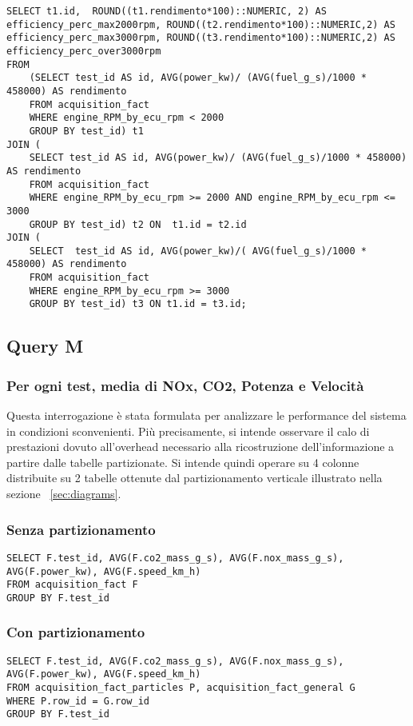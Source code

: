 \begin{lstlisting}[language=mySQL]
SELECT t1.id,  ROUND((t1.rendimento*100)::NUMERIC, 2) AS efficiency_perc_max2000rpm, ROUND((t2.rendimento*100)::NUMERIC,2) AS efficiency_perc_max3000rpm, ROUND((t3.rendimento*100)::NUMERIC,2) AS efficiency_perc_over3000rpm
FROM
	(SELECT test_id AS id, AVG(power_kw)/ (AVG(fuel_g_s)/1000 * 458000) AS rendimento
	FROM acquisition_fact
	WHERE engine_RPM_by_ecu_rpm < 2000
	GROUP BY test_id) t1
JOIN (
	SELECT test_id AS id, AVG(power_kw)/ (AVG(fuel_g_s)/1000 * 458000) AS rendimento
	FROM acquisition_fact
	WHERE engine_RPM_by_ecu_rpm >= 2000 AND engine_RPM_by_ecu_rpm <= 3000
	GROUP BY test_id) t2 ON  t1.id = t2.id
JOIN (
	SELECT  test_id AS id, AVG(power_kw)/( AVG(fuel_g_s)/1000 * 458000) AS rendimento
	FROM acquisition_fact
	WHERE engine_RPM_by_ecu_rpm >= 3000
	GROUP BY test_id) t3 ON t1.id = t3.id;
\end{lstlisting}

\subsection{Query M}
\subsubsection{Per ogni test, media di NOx, CO2, Potenza e Velocità}
Questa interrogazione è stata formulata per analizzare le performance del sistema in condizioni sconvenienti. Più precisamente, si intende osservare il calo di prestazioni dovuto all'overhead necessario alla ricostruzione dell'informazione a partire dalle tabelle partizionate. Si intende quindi operare su 4 colonne distribuite su 2 tabelle ottenute dal partizionamento verticale illustrato nella sezione ~\ref{sec:diagrams}.
\subsubsection{Senza partizionamento}
\begin{lstlisting}[language=mySQL]
SELECT F.test_id, AVG(F.co2_mass_g_s), AVG(F.nox_mass_g_s), AVG(F.power_kw), AVG(F.speed_km_h)
FROM acquisition_fact F
GROUP BY F.test_id
\end{lstlisting}

\subsubsection{Con partizionamento}
\begin{lstlisting}[language=mySQL]
SELECT F.test_id, AVG(F.co2_mass_g_s), AVG(F.nox_mass_g_s), AVG(F.power_kw), AVG(F.speed_km_h)
FROM acquisition_fact_particles P, acquisition_fact_general G
WHERE P.row_id = G.row_id
GROUP BY F.test_id
\end{lstlisting}

